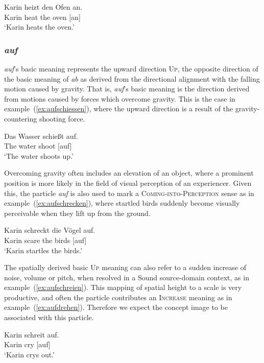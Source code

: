 \documentclass[output=paper]{langsci/langscibook}
\begin{document}
\ea\label{ex:anheizen}
\gll Karin heizt den Ofen an.\\
Karin heat the oven [an]\\
\glt `Karin heats the oven.'
\z

\vspace{+1mm}
\subsubsection{\textit{auf}}

\textit{auf}'s basic meaning represents the upward direction
\textsc{Up}, the opposite direction of the basic meaning of
\textit{ab} as derived from the directional alignment with the falling
motion caused by gravity. That is, \textit{auf}'s basic meaning is the
direction derived from motions caused by forces which overcome
gravity. This is the case in example~(\ref{ex:aufschiessen}), where
the upward direction is a result of the gravity-countering shooting
force.

\ea\label{ex:aufschiessen}
\gll Das Wasser schießt auf.\\
The water shoot [auf]\\
\glt `The water shoots up.'
\z

Overcoming gravity often includes an elevation of an object, where a
prominent position is more likely in the field of visual perception of
an experiencer. Given this, the particle \textit{auf} is also used to
mark a \textsc{Coming-into-Perception} sense as in
example~(\ref{ex:aufschrecken}), where startled birds suddenly become
visually perceivable when they lift up from the ground.

\ea\label{ex:aufschrecken}
\gll Karin schreckt die Vögel auf.\\
Karin scare the birds [auf]\\
\glt `Karin startles the birds.'
\z

The spatially derived basic \textsc{Up} meaning can also refer to a
sudden increase of noise, volume or pitch, when resolved in a
Sound source-domain context, as in
example~(\ref{ex:aufschreien}). This mapping of spatial height to a
scale is very productive, and often the particle contributes an
\textsc{Increase} meaning as in
example~(\ref{ex:aufdrehen}). Therefore we expect the concept image
 to be associated with this particle.

\ea\label{ex:aufschreien}
\gll Karin schreit auf.\\
Karin cry [auf]\\
\glt `Karin crys out.'
\z
\end{document}

